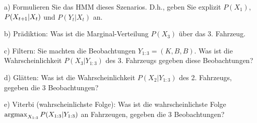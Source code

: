 a) Formulieren Sie das HMM dieses Szenarios. D.h., geben Sie explizit
$P(X_1)$, $P(X_{t{{\hspace*{-.0pt}\text{\rm +}\hspace*{-.5pt}}1}}|X_t)$ und $P(Y_t|X_t)$ an.

b) Prädiktion: Was ist die Marginal-Verteilung $P(X_3)$ über das
3. Fahrzeug.

c) Filtern: Sie machten die Beobachtungen $Y_{1:3}=(K, B,
B)$. Was ist die Wahrscheinlichkeit $P(X_3|Y_{1:3})$ des 3. Fahrzeugs
gegeben diese Beobachtungen?

d) Glätten: Was ist die Wahrscheinlichkeit $P(X_2|Y_{1:3})$ des 2. Fahrzeugs,
gegeben die 3 Beobachtungen?

e) Viterbi (wahrscheinlichste Folge): Was ist die wahrscheinlichste
Folge \\ $\operatorname*{argmax}_{X_{1:3}} P(X_{1:3}|Y_{1:3})$ an Fahrzeugen, gegeben
  die 3 Beobachtungen?

